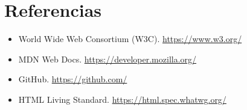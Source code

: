 \documentclass{article}
\begin{document}

\clearpage

\section{Referencias}

\begin{itemize}

    \item World Wide Web Consortium (W3C).
    \url{https://www.w3.org/}

    \item MDN Web Docs.
    \url{https://developer.mozilla.org/}

    \item GitHub.
    \url{https://github.com/}

    \item HTML Living Standard.
    \url{https://html.spec.whatwg.org/}

\end{itemize}

\end{document}
